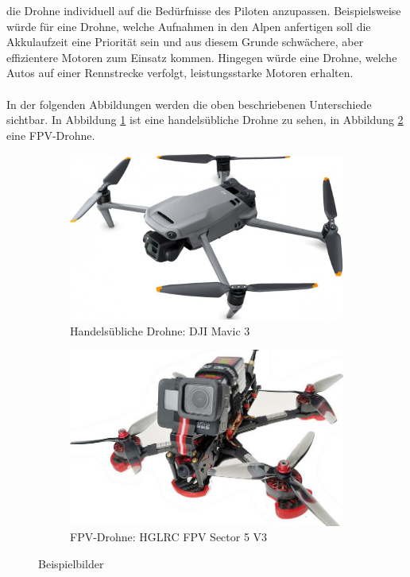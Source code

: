         die Drohne individuell auf die Bedürfnisse des Piloten anzupassen. Beispielsweise würde für eine Drohne,
        welche Aufnahmen in den Alpen anfertigen soll die Akkulaufzeit eine Priorität sein und aus diesem Grunde
        schwächere, aber effizientere Motoren zum Einsatz kommen. Hingegen würde eine Drohne, welche Autos
        auf einer Rennstrecke verfolgt, leistungsstarke Motoren erhalten. \\
        \\
        In der folgenden Abbildungen werden die oben beschriebenen Unterschiede sichtbar. In Abbildung \ref*{HandelsueblicheDrohne}
        ist eine handelsübliche Drohne zu sehen, in Abbildung \ref*{FpvDrohne} eine FPV-Drohne.

        \vspace{1.2cm}
        \begin{figure}[h]
            \centering
            \begin{subfigure}[b]{0.45\textwidth}
                \centering
                \includegraphics[width=\textwidth]{Img/Bild_DJIMavic3.jpg}
                \caption{Handelsübliche Drohne: DJI Mavic 3\cite{BildMavic3}}
                \label{HandelsueblicheDrohne}
            \end{subfigure}
            \hfill
            \begin{subfigure}[b]{0.45\textwidth}
                \centering
                \includegraphics[width=\textwidth]{Img/Bild_FPV.jpg}
                \caption{FPV-Drohne: HGLRC FPV Sector 5 V3\cite{BildFpv}}
                \label{FpvDrohne}
            \end{subfigure}
               \caption{Beispielbilder}
               \label{BeispielBilder}
       \end{figure}